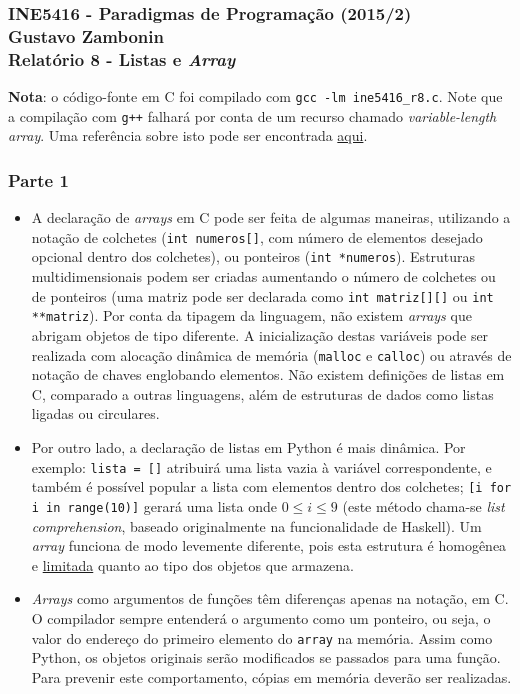 \documentclass{article}
\begin{document}
\subsubsection*{INE5416 - Paradigmas de Programação (2015/2) \\
    Gustavo Zambonin \\
    Relatório 8 - Listas e \textit{Array}
}

\textbf{Nota}: o código-fonte em C foi compilado com
\texttt{gcc -lm ine5416\_r8.c}. Note que a compilação com \texttt{g++} falhará
por conta de um recurso chamado \textit{variable-length array}. Uma referência
sobre isto pode ser encontrada \href{http://stackoverflow.com/a/25552114}{aqui}.

\subsubsection*{Parte 1}
\begin{itemize}
    \item A declaração de \textit{arrays} em C pode ser feita de algumas
    maneiras, utilizando a notação de colchetes (\texttt{int numeros[]}, com
    número de elementos desejado opcional dentro dos colchetes), ou ponteiros
    (\texttt{int *numeros}). Estruturas multidimensionais podem ser criadas
    aumentando o número de colchetes ou de ponteiros (uma matriz pode ser
    declarada como \texttt{int matriz[][]} ou \texttt{int **matriz}). Por conta
    da tipagem da linguagem, não existem \textit{arrays} que abrigam objetos
    de tipo diferente. A inicialização destas variáveis pode ser realizada
    com alocação dinâmica de memória (\texttt{malloc} e \texttt{calloc}) ou
    através de notação de chaves englobando elementos. Não existem definições
    de listas em C, comparado a outras linguagens, além de estruturas de dados
    como listas ligadas ou circulares.
    \item Por outro lado, a declaração de listas em Python é mais dinâmica.
    Por exemplo: \texttt{lista = []} atribuirá uma lista vazia à variável
    correspondente, e também é possível popular a lista com elementos dentro
    dos colchetes; \texttt{[i for i in range(10)]} gerará uma lista onde
    $0 \leq i \leq 9$ (este método chama-se \textit{list comprehension},
    baseado originalmente na funcionalidade de Haskell). Um \textit{array}
    funciona de modo levemente diferente, pois esta estrutura é homogênea
    e \href{https://docs.python.org/2/library/array.html}{limitada} quanto ao
    tipo dos objetos que armazena.
    \item \textit{Arrays} como argumentos de funções têm diferenças apenas
    na notação, em C. O compilador sempre entenderá o argumento como um
    ponteiro, ou seja, o valor do endereço do primeiro elemento do
    \texttt{array} na memória. Assim como Python, os objetos originais serão
    modificados se passados para uma função. Para prevenir este comportamento,
    cópias em memória deverão ser realizadas.
\end{itemize}
\end{document}
